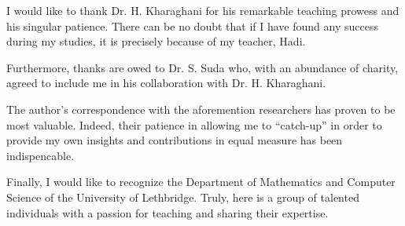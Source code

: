 \documentclass[../../main]{subfiles}
\begin{document}
 I would like to thank Dr. H. Kharaghani for his remarkable teaching prowess and his singular patience. There can be no doubt that if I have found any success during my studies, it is precisely because of my teacher, Hadi. 
 
 Furthermore, thanks are owed to Dr. S. Suda who, with an abundance of charity, agreed to include me in his collaboration with Dr. H. Kharaghani.

 The author's correspondence with the aforemention researchers has proven to be
 most valuable. Indeed, their patience in allowing me to ``catch-up'' in order
 to provide my own insights and contributions in equal measure has been indispencable.
 
 Finally, I would like to recognize the Department of Mathematics and Computer Science of the University of Lethbridge. Truly, here is a group of talented individuals with a passion for teaching and sharing their expertise.
\end{document}
